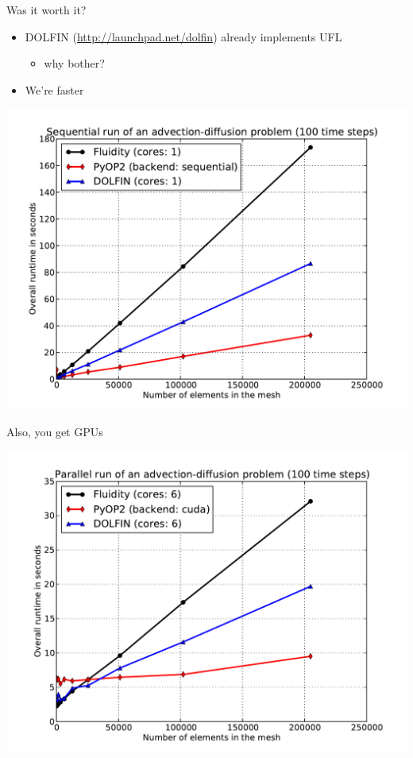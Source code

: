 \documentclass[bigger]{beamer}
\begin{document}
\begin{frame}[label={sec:orgheadline22}]{Was it worth it?}
\begin{itemize}
\item DOLFIN (\url{http://launchpad.net/dolfin}) already implements UFL
\begin{itemize}
\item why bother?
\end{itemize}
\item We're faster
\end{itemize}
\begin{center}
\includegraphics[width=.75\textheight]{01-22-HIPEAC-PyOP2.figures/sequential.pdf}
\end{center}
\end{frame}

\begin{frame}[label={sec:orgheadline23}]{Also, you get GPUs}
\begin{center}
\includegraphics[width=.9\textheight]{01-22-HIPEAC-PyOP2.figures/cuda.pdf}
\end{center}
\end{frame}
\end{document}

